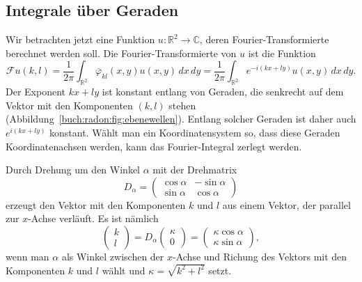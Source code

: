 %
%
\subsection{Integrale über Geraden
\label{buch:radon:definition:subsection:geraden}}
Wir betrachten jetzt eine Funktion $u\colon \mathbb{R}^2\to\mathbb{C}$,
deren Fourier-Transformierte berechnet werden soll.
Die Fourier-Transformierte von $u$ ist die Funktion
\[
\mathscr{F}u(k,l)
=
\frac{1}{2\pi}
\int_{\mathbb{R}^2}
\overline{\varphi}_{kl}(x,y)
u(x,y)
\,dx\,dy
=
\frac{1}{2\pi}
\int_{\mathbb{R}^2}
e^{-i(kx+ly)}
u(x,y)
\,dx\,dy.
\]
Der Exponent $kx+ly$ ist konstant entlang von Geraden, die
senkrecht auf dem Vektor mit den Komponenten $(k,l)$ stehen
(Abbildung~\ref{buch:radon:fig:ebenewellen}).
Entlang solcher Geraden ist daher auch $e^{i(kx+ly)}$ konstant.
Wählt man ein Koordinatensystem so, dass diese Geraden
Koordinatenachsen werden, kann das Fourier-Integral zerlegt werden.

Durch Drehung um den Winkel $\alpha$ mit der Drehmatrix
\[
D_\alpha
=
\begin{pmatrix*}
\cos\alpha&-\sin\alpha\\
\sin\alpha& \cos\alpha
\end{pmatrix*}
\]
erzeugt den Vektor mit den Komponenten $k$ und $l$ aus einem
Vektor, der parallel zur $x$-Achse verläuft.
Es ist nämlich
\[
\begin{pmatrix}k\\l\end{pmatrix}
=
D_\alpha
\begin{pmatrix}\kappa\\0\end{pmatrix}
=
\begin{pmatrix}
\kappa\cos\alpha\\
\kappa\sin\alpha
\end{pmatrix},
\]
wenn man $\alpha$ als Winkel zwischen der $x$-Achse und Richung
des Vektors mit den Komponenten $k$ und $l$ wählt und
$\kappa=\!\sqrt{k^2+l^2}$ setzt.

